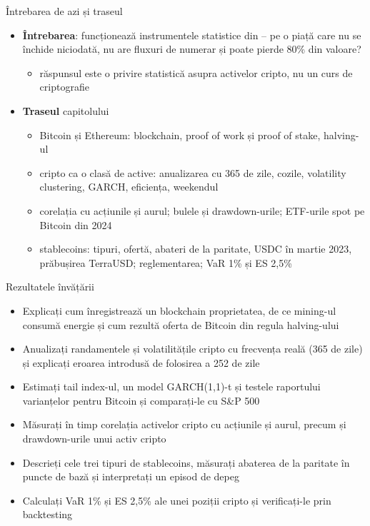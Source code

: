 \begin{frame}{Întrebarea de azi și traseul}
\itemsize{\small}
\begin{itemize}
    \item \textbf{Întrebarea}: funcționează instrumentele statistice din -- pe o piață care nu se închide niciodată, nu are fluxuri de numerar și poate pierde 80\% din valoare?
    \begin{itemize}
        \item răspunsul este o privire statistică asupra activelor cripto, nu un curs de criptografie
    \end{itemize}
    \item \textbf{Traseul} capitolului
    \begin{itemize}
        \item Bitcoin și Ethereum: blockchain, proof of work și proof of stake, halving-ul
        \item cripto ca o clasă de active: anualizarea cu 365 de zile, cozile, volatility clustering, GARCH, eficiența, weekendul
        \item corelația cu acțiunile și aurul; bulele și drawdown-urile; ETF-urile spot pe Bitcoin din 2024
        \item stablecoins: tipuri, ofertă, abateri de la paritate, USDC în martie 2023, prăbușirea TerraUSD; reglementarea; VaR 1\% și ES 2,5\%
    \end{itemize}
\end{itemize}
\end{frame}

\begin{frame}{Rezultatele învățării}
\itemsize{\small}
\begin{itemize}
    \item Explicați cum înregistrează un blockchain proprietatea, de ce mining-ul consumă energie și cum rezultă oferta de Bitcoin din regula halving-ului
    \item Anualizați randamentele și volatilitățile cripto cu frecvența reală (365 de zile) și explicați eroarea introdusă de folosirea a 252 de zile
    \item Estimați tail index-ul, un model GARCH(1,1)-t și testele raportului varianțelor pentru Bitcoin și comparați-le cu S\&P 500
    \item Măsurați în timp corelația activelor cripto cu acțiunile și aurul, precum și drawdown-urile unui activ cripto
    \item Descrieți cele trei tipuri de stablecoins, măsurați abaterea de la paritate în puncte de bază și interpretați un episod de depeg
    \item Calculați VaR 1\% și ES 2,5\% ale unei poziții cripto și verificați-le prin backtesting
\end{itemize}
\end{frame}

